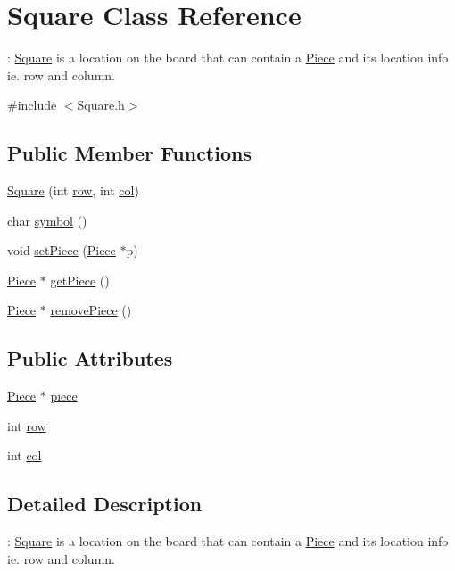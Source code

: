 \hypertarget{classSquare}{}\section{Square Class Reference}
\label{classSquare}


\+: \hyperlink{classSquare}{Square} is a location on the board that can contain a \hyperlink{classPiece}{Piece} and its location info ie. row and column.  




{\ttfamily \#include $<$Square.\+h$>$}

\subsection*{Public Member Functions}
\begin{DoxyCompactItemize}
\item 
\hyperlink{classSquare_a2fafe3d65a3b4166f1fe8b6540db2199}{Square} (int \hyperlink{classSquare_aa353950a9ef437401db55ae605b0f8b9}{row}, int \hyperlink{classSquare_a08d4af37ead0391bec8f9cbaff083da0}{col})
\item 
char \hyperlink{classSquare_a3b726fee24c8f3d56b10520227ba003e}{symbol} ()
\item 
void \hyperlink{classSquare_a7cf9aa874fea67f6a9056cad15752ab2}{set\+Piece} (\hyperlink{classPiece}{Piece} $\ast$p)
\item 
\hyperlink{classPiece}{Piece} $\ast$ \hyperlink{classSquare_a94d3716814970130772e0f93f9c6f5c1}{get\+Piece} ()
\item 
\hyperlink{classPiece}{Piece} $\ast$ \hyperlink{classSquare_a21ec1e5b9fb287c33f911ef032443503}{remove\+Piece} ()
\end{DoxyCompactItemize}
\subsection*{Public Attributes}
\begin{DoxyCompactItemize}
\item 
\hyperlink{classPiece}{Piece} $\ast$ \hyperlink{classSquare_a52eab334fb3f4fe8d29f1f1b7570a52f}{piece}
\item 
int \hyperlink{classSquare_aa353950a9ef437401db55ae605b0f8b9}{row}
\item 
int \hyperlink{classSquare_a08d4af37ead0391bec8f9cbaff083da0}{col}
\end{DoxyCompactItemize}


\subsection{Detailed Description}
\+: \hyperlink{classSquare}{Square} is a location on the board that can contain a \hyperlink{classPiece}{Piece} and its location info ie. row and column. 

